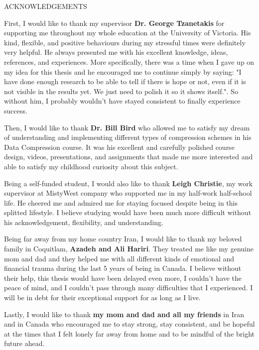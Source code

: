 \newpage
{}

\begin{center}
ACKNOWLEDGEMENTS
\end{center}

\noindent First, I would like to thank my supervisor \textbf{Dr. George Tzanetakis} for supporting me throughout my whole education at the University of Victoria. His kind, flexible, and positive behaviours during my stressful times were definitely very helpful. He always presented me with his excellent knowledge, ideas, references, and experiences. More specifically, there was a time when I gave up on my idea for this thesis and he encouraged me to continue simply by saying: "I have done enough research to be able to tell if there is hope or not, even if it is not visible in the results yet. We just need to polish it so it shows itself.". So without him, I probably wouldn't have stayed consistent to finally experience success.

Then, I would like to thank \textbf{Dr. Bill Bird} who allowed me to satisfy my dream of understanding and implementing different types of compression schemes in his Data Compression course. It was his excellent and carefully polished course design, videos, presentations, and assignments that made me more interested and able to satisfy my childhood curiosity about this subject.

Being a self-funded student, I would also like to thank \textbf{Leigh Christie}, my work supervisor at MistyWest company who supported me in my half-work half-school life. He cheered me and admired me for staying focused despite being in this splitted lifestyle. I believe studying would have been much more difficult without his acknowledgement, flexibility, and understanding.

Being far away from my home country Iran, I would like to thank my beloved family in Coquitlam, \textbf{Azadeh and Ali Hariri}. They treated me like my genuine mom and dad and they helped me with all different kinds of emotional and financial trauma during the last 5 years of being in Canada. I believe without their help, this thesis would have been delayed even more, I couldn't have the peace of mind, and I couldn't pass through many difficulties that I experienced. I will be in debt for their exceptional support for as long as I live.

Lastly, I would like to thank \textbf{my mom and dad and all my friends} in Iran and in Canada who encouraged me to stay strong, stay consistent, and be hopeful at the times that I felt lonely far away from home and to be mindful of the bright future ahead.

